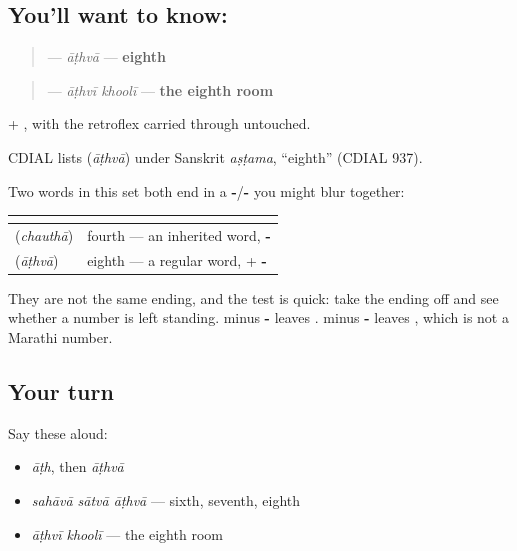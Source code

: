\subsection*{You'll want to know: }
\begin{quote}
\textbf{} — \emph{āṭhvā} — \textbf{eighth}
\end{quote}

\begin{quote}
\textbf{ } — \emph{āṭhvī khoolī} — \textbf{the eighth room}
\end{quote}

\textbf{} + \textbf{}, with the retroflex \textbf{} carried through untouched.

\begin{cousinweb}
CDIAL lists \textbf{} (\emph{āṭhvā}) under Sanskrit \emph{aṣṭama}, \textquotedblleft{}eighth\textquotedblright{} (CDIAL 937).
\end{cousinweb}

\begin{grammarlens}[title={Grammar Lens: the pair to keep apart}]
Two words in this set both end in a \textbf{-}/\textbf{-} you might blur together:

\noindent
\begin{tabularx}{\linewidth}{@{}>{\raggedright\arraybackslash}X>{\raggedright\arraybackslash}X@{}}
\toprule
\textbf{} & \textbf{} \\
\midrule
\textbf{\mr{चौथा}} (\emph{chauthā}) & fourth — an inherited word, \textbf{-\mr{था}} \\
\textbf{\mr{आठवा}} (\emph{āṭhvā}) & eighth — a regular word, \textbf{\mr{आठ}} + \textbf{-\mr{वा}} \\
\bottomrule
\end{tabularx}

They are not the same ending, and the test is quick: take the ending off and see whether a number is left standing. \textbf{} minus \textbf{-} leaves \textbf{}. \textbf{} minus \textbf{-} leaves \textbf{}, which is not a Marathi number.
\end{grammarlens}

\subsection*{Your turn}
Say these aloud:

\begin{itemize}
\raggedright
  \item \emph{āṭh}, then \emph{āṭhvā}
  \item \emph{sahāvā sātvā āṭhvā} — sixth, seventh, eighth
  \item \emph{āṭhvī khoolī} — the eighth room
\end{itemize}

